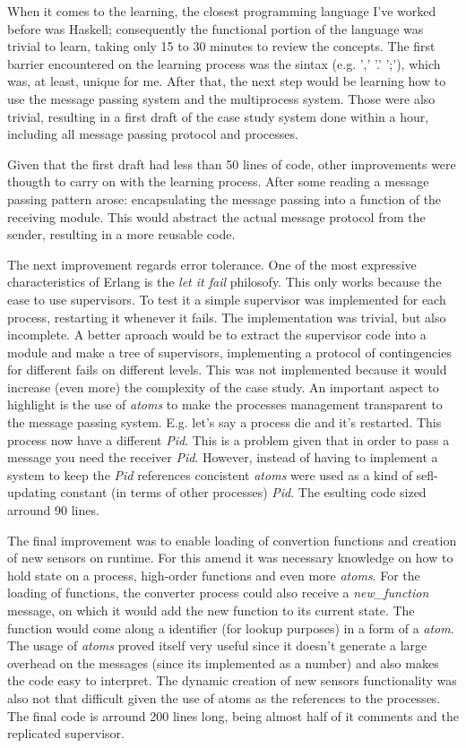 \documentclass[twocolumn,10pt]{article}
\begin{document}
When it comes to the learning, the closest programming language I've worked before was Haskell; consequently the functional portion of the language was trivial to learn, taking only 15 to 30 minutes to review the concepts. The first barrier encountered on the learning process was the sintax (e.g. ',' '.' ';'), which was, at least, unique for me. After that, the next step would be learning how to use the message passing system and the multiprocess system. Those were also trivial, resulting in a first draft of the case study system done within a hour, including all message passing protocol and processes.

Given that the first draft had less than 50 lines of code, other improvements were thougth to carry on with the learning process. After some reading a message passing pattern arose: encapsulating the message passing into a function of the receiving module. This would abstract the actual message protocol from the sender, resulting in a more reusable code.

The next improvement regards error tolerance. One of the most expressive characteristics of Erlang is the \textit{let it fail} philosofy. This only works because the ease to use supervisors. To test it a simple supervisor was implemented for each process, restarting it whenever it fails. The implementation was trivial, but also incomplete. A better aproach would be to extract the supervisor code into a module and make a tree of supervisors, implementing a protocol of contingencies for different fails on different levels. This was not implemented because it would increase (even more) the complexity of the case study. An important aspect to highlight is the use of \textit{atoms} to make the processes management transparent to the message passing system. E.g. let's say a process die and it's restarted. This process now have a different \textit{Pid}. This is a problem given that in order to pass a message you need the receiver \textit{Pid}. However, instead of having to implement a system to keep the \textit{Pid} references concistent \textit{atoms} were used as a kind of sefl-updating constant (in terms of other processes) \textit{Pid}. The esulting code sized arround 90 lines.

The final improvement was to enable loading of convertion functions and creation of new sensors on runtime. For this amend it was necessary knowledge on how to hold state on a process, high-order functions and even more \textit{atoms}. For the loading of functions, the converter process could also receive a \textit{new\_function} message, on which it would add  the new function to its current state. The function would come along a identifier (for lookup purposes) in a form of a \textit{atom}. The usage of \textit{atoms} proved itself very useful since it doesn't generate a large overhead on the messages (since its implemented as a number) and also makes the code easy to interpret. The dynamic creation of new sensors functionality was also not that difficult given the use of atoms as the references to the processes. The final code is arround 200 lines long, being almost half of it comments and the replicated supervisor.
\end{document}
